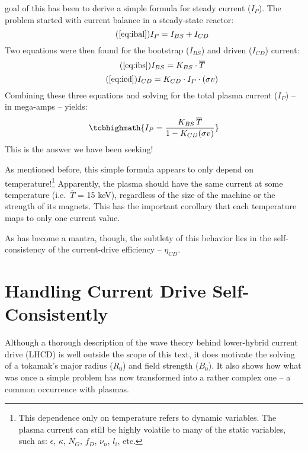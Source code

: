  goal of this  has been to derive a simple formula for steady current ($I_P$). The problem started with current balance in a steady-state reactor:
\begin{equation}
	\tag{\ref{eq:ibal}}
	I_P = I_{BS} + I_{CD}
\end{equation}
Two equations were then found for the bootstrap ($I_{BS}$) and driven ($I_{CD}$) current:
\begin{equation}
	\tag{\ref{eq:ibs}}
	I_{BS} = K_{BS} \cdot \overline T
\end{equation}
\begin{equation}
	\tag{\ref{eq:icd}}
	I_{CD} = K_{CD} \cdot I_P \cdot ( \sigma v )
\end{equation}
Combining these three equations and solving for the total plasma current ($I_P$) -- in mega-amps -- yields:
\begin{equation}
	\label{eq:steady}
	\tcbhighmath{
	I_P = \frac{ K_{BS} \, \overline T }{ 1 - K_{CD} ( \sigma v ) }
	}
\end{equation}
This is the answer we have been seeking!

As mentioned before, this simple formula appears to only depend on temperature!\footnote{ This dependence only on temperature refers to dynamic variables. The plasma current can still be highly volatile to many of the static variables, such as: $\epsilon$, $\kappa$, $N_G$, $f_D$, $\nu_n$, $l_i$, etc. } Apparently, the plasma should have the same current at some temperature (i.e.\ $\overline T$ = 15 keV), regardless of the size of the machine or the strength of its magnets. This has the important corollary that each temperature maps to only one current value. 

As has become a mantra, though, the subtlety of this behavior lies in the self-consistency of the current-drive efficiency -- $\eta_{CD}$.

\section{Handling Current Drive Self-Consistently}

Although a thorough description of the wave theory behind lower-hybrid current drive (LHCD) is well outside the scope of this text, it does motivate the solving of a tokamak's major radius ($R_0$) and field strength ($B_0$). It also shows how what was once a simple problem has now transformed into a rather complex one -- a common occurrence with plasmas.

